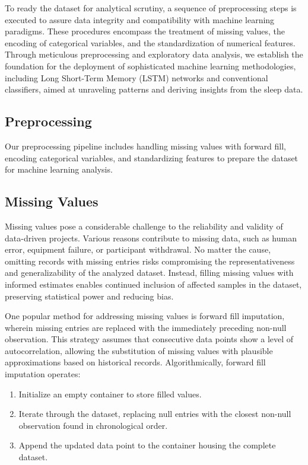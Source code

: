 \documentclass[10pt]{extarticle}
\begin{document}
To ready the dataset for analytical scrutiny, a sequence of preprocessing steps is executed to assure data integrity and compatibility with machine learning paradigms. These procedures encompass the treatment of missing values, the encoding of categorical variables, and the standardization of numerical features. Through meticulous preprocessing and exploratory data analysis, we establish the foundation for the deployment of sophisticated machine learning methodologies, including Long Short-Term Memory (LSTM) networks and conventional classifiers, aimed at unraveling patterns and deriving insights from the sleep data.

\subsection{Preprocessing}

Our preprocessing pipeline includes handling missing values with forward fill, encoding categorical variables, and standardizing features to prepare the dataset for machine learning analysis.

\subsection{Missing Values}

Missing values pose a considerable challenge to the reliability and validity of data-driven projects. Various reasons contribute to missing data, such as human error, equipment failure, or participant withdrawal. No matter the cause, omitting records with missing entries risks compromising the representativeness and generalizability of the analyzed dataset. Instead, filling missing values with informed estimates enables continued inclusion of affected samples in the dataset, preserving statistical power and reducing bias.

One popular method for addressing missing values is forward fill imputation, wherein missing entries are replaced with the immediately preceding non-null observation. This strategy assumes that consecutive data points show a level of autocorrelation, allowing the substitution of missing values with plausible approximations based on historical records. Algorithmically, forward fill imputation operates:

\begin{enumerate}
\item Initialize an empty container to store filled values.
\item Iterate through the dataset, replacing null entries with the closest non-null observation found in chronological order.
\item Append the updated data point to the container housing the complete dataset.
\end{enumerate}
\end{document}
